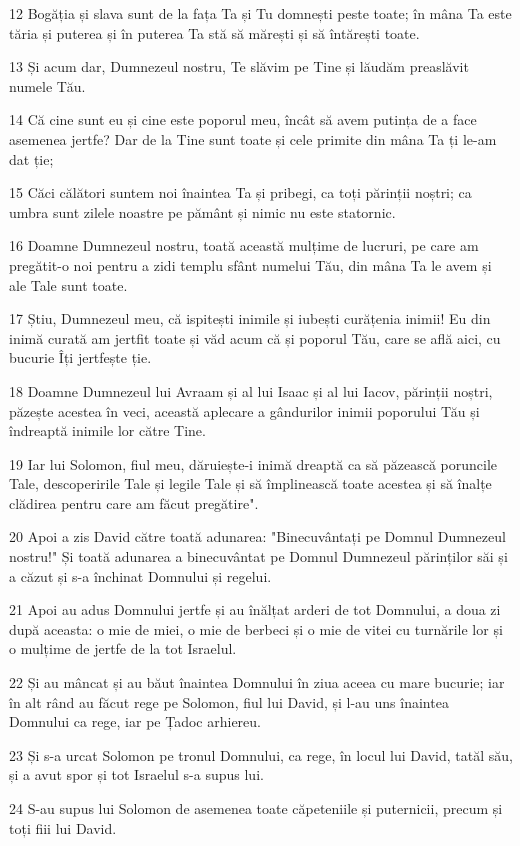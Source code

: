 \par 12 Bogăția și slava sunt de la fața Ta și Tu domnești peste toate; în mâna Ta este tăria și puterea și în puterea Ta stă să mărești și să întărești toate.
\par 13 Și acum dar, Dumnezeul nostru, Te slăvim pe Tine și lăudăm preaslăvit numele Tău.
\par 14 Că cine sunt eu și cine este poporul meu, încât să avem putința de a face asemenea jertfe? Dar de la Tine sunt toate și cele primite din mâna Ta ți le-am dat ție;
\par 15 Căci călători suntem noi înaintea Ta și pribegi, ca toți părinții noștri; ca umbra sunt zilele noastre pe pământ și nimic nu este statornic.
\par 16 Doamne Dumnezeul nostru, toată această mulțime de lucruri, pe care am pregătit-o noi pentru a zidi templu sfânt numelui Tău, din mâna Ta le avem și ale Tale sunt toate.
\par 17 Știu, Dumnezeul meu, că ispitești inimile și iubești curățenia inimii! Eu din inimă curată am jertfit toate și văd acum că și poporul Tău, care se află aici, cu bucurie Îți jertfește ție.
\par 18 Doamne Dumnezeul lui Avraam și al lui Isaac și al lui Iacov, părinții noștri, păzește acestea în veci, această aplecare a gândurilor inimii poporului Tău și îndreaptă inimile lor către Tine.
\par 19 Iar lui Solomon, fiul meu, dăruiește-i inimă dreaptă ca să păzească poruncile Tale, descoperirile Tale și legile Tale și să împlinească toate acestea și să înalțe clădirea pentru care am făcut pregătire".
\par 20 Apoi a zis David către toată adunarea: "Binecuvântați pe Domnul Dumnezeul nostru!" Și toată adunarea a binecuvântat pe Domnul Dumnezeul părinților săi și a căzut și s-a închinat Domnului și regelui.
\par 21 Apoi au adus Domnului jertfe și au înălțat arderi de tot Domnului, a doua zi după aceasta: o mie de miei, o mie de berbeci și o mie de vitei cu turnările lor și o mulțime de jertfe de la tot Israelul.
\par 22 Și au mâncat și au băut înaintea Domnului în ziua aceea cu mare bucurie; iar în alt rând au făcut rege pe Solomon, fiul lui David, și l-au uns înaintea Domnului ca rege, iar pe Țadoc arhiereu.
\par 23 Și s-a urcat Solomon pe tronul Domnului, ca rege, în locul lui David, tatăl său, și a avut spor și tot Israelul s-a supus lui.
\par 24 S-au supus lui Solomon de asemenea toate căpeteniile și puternicii, precum și toți fiii lui David.
